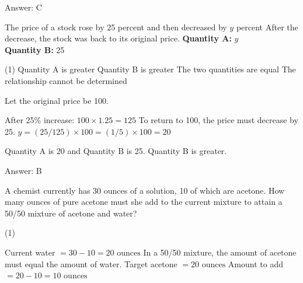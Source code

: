 \documentclass[11pt,paper=a4,answers]{exam}
\begin{document}
\begin{questions}
\begin{solution}
Answer: \colorbox{yellow!100}{C}
\end{solution}

\vspace{1cm}

\question
The price of a stock rose by 25 percent and then decreased by $y$ percent After the decrease, the stock was back to its original price.
\vspace{5pt}
\textbf{Quantity A: } $y$ \\
\vspace{5pt}
\textbf{Quantity B: } 25

\begin{tasks}(1)
\task[A)] Quantity A is greater
\task[B)] Quantity B is greater
\task[C)] The two quantities are equal
\task[D)] The relationship cannot be determined
\end{tasks}

\begin{solution}
Let the original price be 100.
\vspace{5pt}
\begin{center}
After 25\% increase: $100 \times 1.25 = 125$
\vspace{5pt}
To return to 100, the price must decrease by 25.
\vspace{5pt}
$y = (25 / 125) \times 100 = (1/5) \times 100 = 20$
\end{center}
\vspace{5pt}
Quantity A is 20 and Quantity B is 25. Quantity B is greater.

Answer: \colorbox{yellow!100}{B}
\end{solution}

\vspace{1cm}


\question
A chemist currently has 30 ounces of a solution, 10 of which are acetone. How many ounces of pure acetone must she add to the current mixture to attain a 50/50 mixture of acetone and water?

\begin{tasks}(1)
    
\end{tasks}

\begin{solution}
\begin{center}
Current water $= 30 - 10 = 20 \text{ ounces}$
\vspace{5pt}
In a 50/50 mixture, the amount of acetone must equal the amount of water.
\vspace{5pt}
Target acetone $= 20 \text{ ounces}$
\vspace{5pt}
Amount to add $= 20 - 10 = 10 \text{ ounces}$
\end{center}


\end{solution}
\end{questions}
\end{document}
